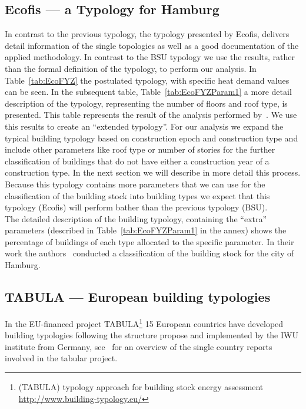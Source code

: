 

\subsection{Ecofis --- a Typology for Hamburg}\label{sub-sec:ecofis}

In contrast to the previous typology, the typology presented by Ecofis,
delivers detail information of the single topologies as well as a good
documentation of the applied methodology.  In contrast to the BSU typology we
use the results, rather than the formal definition of the typology, to perform
our analysis.  In Table~\ref{tab:EcoFYZ} the postulated typology, with specific
heat demand values can be seen.  In the subsequent table,
Table~\ref{tab:EcoFYZParam1} a more detail description of the typology,
representing the number of floors and roof type, is presented.  This table
represents the result of the analysis performed by~\citet{Hermelink.2011}.
We use this results to create an ``extended typology''.  For our analysis we
expand the typical building typology based on construction epoch and
construction type and include other parameters like roof type or number of
stories for the further classification of buildings that do not have either a
construction year of a construction type.  In the next section we will describe
in more detail this process.  Because this typology contains more parameters
that we can use for the classification of the building stock into building
types we expect that this typology (Ecofis) will perform bather than the
previous typology (BSU).\\

The detailed description of the building typology, containing the ``extra''
parameters (described in Table~\ref{tab:EcoFYZParam1} in the annex) shows the percentage of
buildings of each type allocated to the specific parameter.  In their work the
authors~\citet{Hermelink.2011} conducted a classification of the building stock
for the city of Hamburg.\\ 



\subsection{TABULA --- European building typologies}\label{sub-sec:tabular}

In the EU-financed project TABULA\footnote{(TABULA) typology approach for
    building stock energy assessment \url{http://www.building-typology.eu/}}
15 European countries have developed building typologies following the
structure propose and implemented by the IWU institute from Germany,
see~\cite{TABULAProjectTeam.2012c} for an overview of the single country
reports involved in the tabular project.\\


